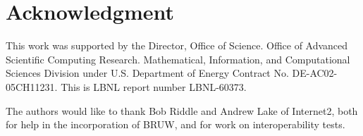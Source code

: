 \documentclass[conference]{IEEEtran}
\begin{document}
\section*{Acknowledgment}
This work was supported by the Director, Office of Science. Office of
Advanced Scientific Computing Research. Mathematical, Information, and
Computational Sciences Division under U.S. Department of
Energy Contract No. DE-AC02-05CH11231. This is LBNL report number LBNL-60373.

The authors would like to thank Bob Riddle and Andrew Lake of Internet2, both
for help in the incorporation of BRUW, and for work on interoperability tests.


\end{document}
